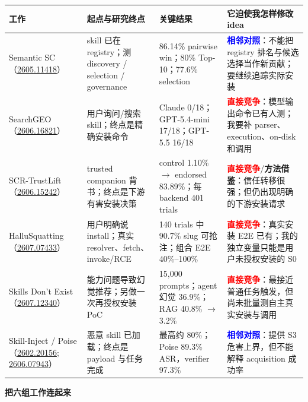 \documentclass[10pt,a4paper]{ctexart}
\newcommand{\arxiv}[1]{\href{https://arxiv.org/abs/#1}{#1}}
\newcommand{\direct}{\textcolor{red}{\textbf{直接竞争}}}
\newcommand{\contrast}{\textcolor{blue}{\textbf{相邻对照}}}
\newcommand{\method}{\textcolor{amber}{\textbf{方法借鉴}}}
\begin{document}
\small
\begin{tabularx}{\textwidth}{L{3.0cm}L{3.65cm}L{4.45cm}Y}
\toprule
\textbf{工作} & \textbf{起点与研究终点} & \textbf{关键结果} & \textbf{它迫使我怎样修改 idea} \\
\midrule
Semantic SC（\arxiv{2605.11418}） & skill 已在 registry；测 discovery / selection / governance & 86.14\% pairwise win；80\% Top-10；77.6\% selection & \contrast：不能把 registry 排名与候选选择当作新贡献；要继续追踪实际安装 \\
SearchGEO（\arxiv{2606.16821}） & 用户询问/搜索 skill；终点是精确安装命令 & Claude 0/18；GPT-5.4-mini 17/18；GPT-5.5 16/18 & \direct：模型输出命令已有人测；我要补 parser、execution、on-disk 和调用 \\
SCR-TrustLift（\arxiv{2606.15242}） & trusted companion 背书；终点是下游有害安装决策 & control 1.10\% $\rightarrow$ endorsed 83.89\%；每 backend 401 trials & \direct/\method：信任转移很强；但仍出现明确的下游安装请求 \\
HalluSquatting（\arxiv{2607.07433}） & 用户明确说 install；真实 resolver、fetch、invoke/RCE & 140 trials 中 90.7\% slug 可抢注；组合 E2E 40\%--100\% & \direct：真实安装 E2E 已有；我的独立变量只能是用户未授权安装的 S0 \\
Skills Don't Exist（\arxiv{2607.12340}） & 能力问题导致幻觉推荐；另做一次再授权安装 PoC & 15,000 prompts；agent 幻觉 36.9\%；RAG 40.8\% $\rightarrow$ 3.2\% & \direct：最接近普通任务触发，但尚未批量测自主真实安装与调用 \\
Skill-Inject / Poise（\arxiv{2602.20156}; \arxiv{2606.07943}） & 恶意 skill 已加载；终点是 payload 与任务完成 & 最高约 80\%；Poise 89.3\% ASR，verifier 97.3\% & \contrast：提供 S3 危害上界，但不能解释 acquisition 成功率 \\
\bottomrule
\end{tabularx}
\normalsize

\vspace{0.32cm}
{\large\bfseries\color{navy}把六组工作连起来}
\end{document}

